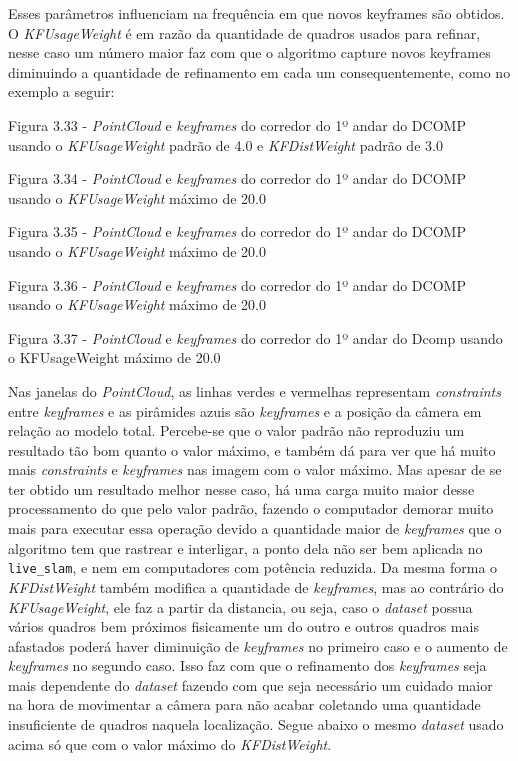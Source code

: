 

Esses parâmetros influenciam na frequência em que novos keyframes são obtidos. O \textit{KFUsageWeight} é em razão da quantidade de quadros usados para refinar, nesse caso um número maior faz com que o algoritmo capture novos keyframes diminuindo a quantidade de refinamento em cada um consequentemente, como no exemplo a seguir:


Figura 3.33 - \textit{PointCloud} e \textit{keyframes} do corredor do 1º andar do DCOMP usando o \textit{KFUsageWeight} padrão de 4.0 e \textit{KFDistWeight} padrão de 3.0

Figura 3.34 - \textit{PointCloud} e \textit{keyframes} do corredor do 1º andar do DCOMP usando o \textit{KFUsageWeight} máximo de 20.0

Figura 3.35 - \textit{PointCloud} e \textit{keyframes} do corredor do 1º andar do DCOMP usando o \textit{KFUsageWeight} máximo de 20.0

Figura 3.36 - \textit{PointCloud} e \textit{keyframes} do corredor do 1º andar do DCOMP usando o \textit{KFUsageWeight} máximo de 20.0

Figura 3.37 - \textit{PointCloud} e \textit{keyframes} do corredor do 1º andar do Dcomp usando o KFUsageWeight máximo de 20.0

Nas janelas do \textit{PointCloud}, as linhas verdes e vermelhas representam \textit{constraints} entre \textit{keyframes} e as pirâmides azuis são \textit{keyframes} e a posição da câmera em relação ao modelo total. Percebe-se que o valor padrão não reproduziu um resultado tão bom quanto o valor máximo, e também dá para ver que há muito mais \textit{constraints} e \textit{keyframes} nas imagem com o valor máximo. Mas apesar de se ter obtido um resultado melhor nesse caso, há uma carga muito maior desse processamento do que pelo valor padrão, fazendo o computador demorar muito mais para executar essa operação devido a quantidade maior de \textit{keyframes} que o algoritmo tem que rastrear e interligar, a ponto dela não ser bem aplicada no \texttt{live\_slam}, e nem em computadores com potência reduzida. Da mesma forma o \textit{KFDistWeight} também modifica a quantidade de \textit{keyframes}, mas ao contrário do \textit{KFUsageWeight}, ele faz a partir da distancia, ou seja, caso o \textit{dataset} possua vários quadros bem próximos fisicamente um do outro e outros quadros mais afastados poderá haver diminuição de \textit{keyframes} no primeiro caso e o aumento de \textit{keyframes} no segundo caso. Isso faz com que o refinamento dos \textit{keyframes} seja mais dependente do \textit{dataset} fazendo com que seja necessário um cuidado maior na hora de movimentar a câmera para não acabar coletando uma quantidade insuficiente de quadros naquela localização. Segue abaixo o mesmo \textit{dataset} usado acima só que com o valor máximo do \textit{KFDistWeight}.

